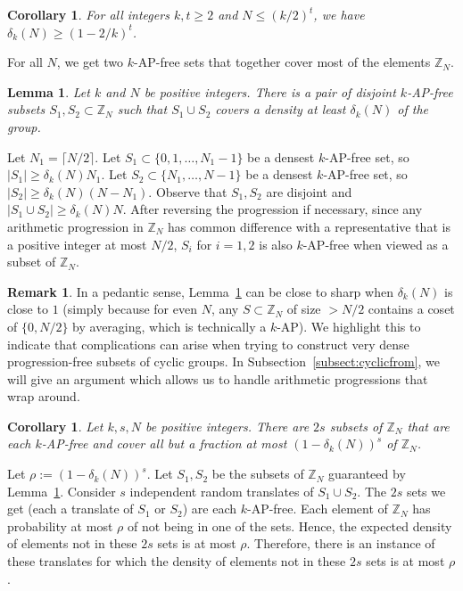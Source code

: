 \documentclass[11pt]{article}
\makeatletter
\numberwithin{equation}{section}
\renewenvironment{proof}[1][\proofname]{\par
  \vspace{-\topsep}%
  \pushQED{\qed}%
  \normalfont
  \topsep0pt \partopsep0pt %
  \trivlist
  \item[\hskip\labelsep
        \itshape
    #1\@addpunct{.}]\ignorespaces
}{%
  \popQED\endtrivlist\@endpefalse
  \addvspace{6pt plus 6pt} %
}
\newtheorem{lem}[result]{Lemma}
\newtheorem{cor}[result]{Corollary}
\theoremstyle{definition}
\newtheorem{rmk}[result]{Remark}
\theoremstyle{remark}
\makeatother
\begin{document}
\begin{cor}\label{generaldeltakbound}
For all integers $k,t \geq 2$ and $N  \leq (k/2)^t$, we have $\delta_k(N) \geq (1-2/k)^t$. 
\end{cor}

For all $N$, we get two $k$-AP-free sets that together cover most of the elements $\mathbb{Z}_N$.

\begin{lem}\label{lemmatwosets0}
Let $k$ and $N$ be positive integers. There is a pair of disjoint $k$-AP-free subsets $S_1,S_2 \subset \mathbb{Z}_N$ such that $S_1 \cup S_2$ covers a density at least $\delta_k(N)$ of the group. 
\end{lem}
\begin{proof}
Let $N_1 = \lceil N/2 \rceil$. Let $S_1 \subset \{0,1,\ldots,N_1-1\}$ be a densest $k$-AP-free set, so $|S_1| \geq \delta_k(N)N_1$. Let $S_2 \subset \{N_1,\ldots,N-1\}$ be a densest $k$-AP-free set, so $|S_2| \geq \delta_k(N)(N-N_1)$. Observe that $S_1,S_2$ are disjoint and $|S_1 \cup S_2| \geq \delta_k(N)N$. After reversing the progression if necessary, since any arithmetic progression in $\mathbb{Z}_N$ has common difference with a representative that is a positive integer at most $N/2$, $S_i$ for $i=1,2$ is also $k$-AP-free when viewed as a subset of $\mathbb{Z}_N$.
\end{proof}
\begin{rmk} In a pedantic sense, Lemma~\ref{lemmatwosets0} can be close to sharp when $\delta_k(N)$ is close to $1$ (simply because for even $N$, any $S\subset \mathbb{Z}_N$ of size $>N/2$ contains a coset of $\{0,N/2\}$ by averaging, which is technically a $k$-AP). We highlight this to indicate that complications can arise when trying to construct very dense progression-free subsets of cyclic groups. In Subsection~\ref{subsect:cyclicfrom}, we will give an argument which allows us to handle arithmetic progressions that wrap around.\end{rmk}

\begin{cor}\label{coruniondense0} 
Let $k,s,N$ be positive integers. There are $2s$ subsets of $\mathbb{Z}_N$ that are each $k$-AP-free and cover all but a fraction at most $(1-\delta_k(N))^{s}$ of $\mathbb{Z}_N$. 
\end{cor}
\begin{proof}
Let $\rho:=(1-\delta_k(N))^{s}$. Let $S_1,S_2$ be the subsets of $\mathbb{Z}_N$ guaranteed by Lemma~\ref{lemmatwosets0}. Consider $s$ independent random translates of $S_1 \cup S_2$. The $2s$ sets we get (each a translate of $S_1$ or $S_2$) are each $k$-AP-free. Each element of $\mathbb{Z}_N$ has probability at most $\rho$ of not being in one of the sets. Hence, the expected density of elements not in these $2s$ sets is at most $\rho$. Therefore, there is an instance of these translates for which the density of elements not in these $2s$ sets is at most $\rho$.
\end{proof}
\end{document}

